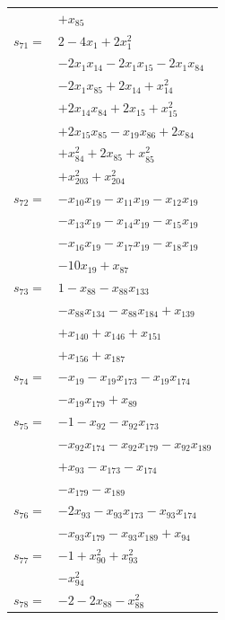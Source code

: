 \begin{longtable}{@{}r@{\;}l@{}}
 & \(\displaystyle +x_{85}\) \\[3pt]
\(s_{71}=\) & \(\displaystyle 2 -4x_{1} +2x_{1}^{2}\) \\
 & \(\displaystyle -2x_{1}x_{14} -2x_{1}x_{15} -2x_{1}x_{84}\) \\
 & \(\displaystyle -2x_{1}x_{85} +2x_{14} +x_{14}^{2}\) \\
 & \(\displaystyle +2x_{14}x_{84} +2x_{15} +x_{15}^{2}\) \\
 & \(\displaystyle +2x_{15}x_{85} -x_{19}x_{86} +2x_{84}\) \\
 & \(\displaystyle +x_{84}^{2} +2x_{85} +x_{85}^{2}\) \\
 & \(\displaystyle +x_{203}^{2} +x_{204}^{2}\) \\[3pt]
\(s_{72}=\) & \(\displaystyle -x_{10}x_{19} -x_{11}x_{19} -x_{12}x_{19}\) \\
 & \(\displaystyle -x_{13}x_{19} -x_{14}x_{19} -x_{15}x_{19}\) \\
 & \(\displaystyle -x_{16}x_{19} -x_{17}x_{19} -x_{18}x_{19}\) \\
 & \(\displaystyle -10x_{19} +x_{87}\) \\[3pt]
\(s_{73}=\) & \(\displaystyle 1 -x_{88} -x_{88}x_{133}\) \\
 & \(\displaystyle -x_{88}x_{134} -x_{88}x_{184} +x_{139}\) \\
 & \(\displaystyle +x_{140} +x_{146} +x_{151}\) \\
 & \(\displaystyle +x_{156} +x_{187}\) \\[3pt]
\(s_{74}=\) & \(\displaystyle -x_{19} -x_{19}x_{173} -x_{19}x_{174}\) \\
 & \(\displaystyle -x_{19}x_{179} +x_{89}\) \\[3pt]
\(s_{75}=\) & \(\displaystyle -1 -x_{92} -x_{92}x_{173}\) \\
 & \(\displaystyle -x_{92}x_{174} -x_{92}x_{179} -x_{92}x_{189}\) \\
 & \(\displaystyle +x_{93} -x_{173} -x_{174}\) \\
 & \(\displaystyle -x_{179} -x_{189}\) \\[3pt]
\(s_{76}=\) & \(\displaystyle -2x_{93} -x_{93}x_{173} -x_{93}x_{174}\) \\
 & \(\displaystyle -x_{93}x_{179} -x_{93}x_{189} +x_{94}\) \\[3pt]
\(s_{77}=\) & \(\displaystyle -1 +x_{90}^{2} +x_{93}^{2}\) \\
 & \(\displaystyle -x_{94}^{2}\) \\[3pt]
\(s_{78}=\) & \(\displaystyle -2 -2x_{88} -x_{88}^{2}\) \\

\end{longtable}
